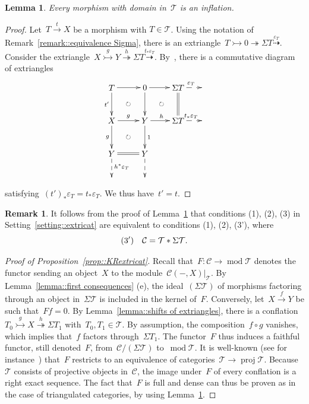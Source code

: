 \documentclass{amsart}
\newtheorem{lemma}[theorem]{Lemma}
\theoremstyle{definition}
\newtheorem{remark}[theorem]{Remark}
\newcommand{\cat}{\mathcal{C}}
\newcommand{\susp}{\Sigma}
\newcommand{\MOD}{\operatorname{mod}}
\newcommand{\proj}{\operatorname{proj}}
\newcommand{\tc}{\mathcal{T}}
\newcommand{\infl}{\rightarrowtail}
\newcommand{\defl}{\twoheadrightarrow}
\newcommand{\modt}{\MOD\tc}
\newcommand{\eps}{\varepsilon}
\begin{document}
\begin{lemma}\label{lemma:: mphs in T are inflations}
Every morphism with domain in~$\tc$ is an inflation.
\end{lemma}

\begin{proof}
Let~$T \overset{t}{\to} X$ be a morphism with $T\in \tc$.
Using the notation of Remark~\ref{remark::equivalence Sigma}, there is an extriangle~$T\infl 0\defl \susp T \overset{\eps_T}{\dashrightarrow}$.
Consider the extriangle~$X\overset{g}{\infl} Y \overset{h}{\defl} \susp T \overset{t_\ast\eps_T}{\dashrightarrow}$.
By~\cite[Proposition 3.17]{NakaokaPalu}, there is a commutative diagram of extriangles
\[
\xy
(-7,7)*+{T}="2";
(7,7)*+{0}="4";
(21,7)*+{\susp T}="6";
(32,7)*+{}="8";
%
(-7,-7)*+{X}="12";
(7,-7)*+{Y}="14";
(21,-7)*+{\susp T}="16";
(32,-7)*+{}="18";
%
(-7,-21)*+{Y}="22";
(7,-21)*+{Y}="24";
%
(-7,-32)*+{}="32";
(7,-32)*+{}="34";
%
{\ar@{->} "2";"4"};
{\ar@{->} "4";"6"};
{\ar@{-->}^{\eps_T} "6";"8"};
%
{\ar@{->}_{t'} "2";"12"};
{\ar "4";"14"};
{\ar@{=} "6";"16"};
%
{\ar^{g} "12";"14"};
{\ar^{h} "14";"16"};
{\ar@{-->}^{t_\ast\eps_T} "16";"18"};
%
{\ar_{g} "12";"22"};
{\ar^{1} "14";"24"};
%
{\ar@{=} "22";"24"};
%
{\ar@{-->}^{h^\ast\eps_T} "22";"32"};
{\ar@{-->} "24";"34"};
%
{\ar@{}|\circlearrowright "2";"14"};
{\ar@{}|\circlearrowright "4";"16"};
{\ar@{}|\circlearrowright "12";"24"};
\endxy
\]
satisfying~$(t')_\ast\eps_T=t_\ast\eps_T$.
We thus have~$t'=t$.
\end{proof}

\begin{remark}
 It follows from the proof of Lemma~\ref{lemma:: mphs in T are inflations} that conditions (1), (2), (3) in Setting~\ref{setting::extricat} are equivalent to conditions (1), (2), (3'), where
\[
{\rm (3')} \ \ \ \cat = \tc\ast\susp\tc.
\]
\end{remark}


\begin{proof}[Proof of Proposition~\ref{prop::KRextricat}]
Recall that~$F:\cat\to\modt$ denotes the functor sending an object~$X$ to the module~$\cat(-,X)|_\tc$.
By Lemma~\ref{lemma::first consequences} (e), the ideal~$(\susp\tc)$ of morphisms factoring through an object in~$\susp\tc$ is included in the kernel of~$F$.
Conversely, let~$X\xrightarrow{f}Y$ be such that~$Ff=0$.
By Lemma~\ref{lemma::shifts of extriangles}, there is a conflation~$T_0\overset{g}{\infl} X\overset{h}{\defl} \susp T_1$ with~$T_0,T_1\in\tc$.
By assumption, the composition~$f\circ g$ vanishes, which implies that~$f$ factors through~$\susp T_1$.
The functor~$F$ thus induces a faithful functor, still denoted~$F$, from~$\cat/(\susp\tc)$ to~$\modt$.
It is well-known (see for instance~\cite[Lemma 3.1]{AssemSimsonSkowronski}) that~$F$ restricts to an equivalence of categories~$\tc\to\proj\tc$.
Because~$\tc$ consists of projective objects in~$\cat$, the image under~$F$ of every conflation is a right exact sequence.
The fact that~$F$ is full and dense can thus be proven as in the case of triangulated categories, by using Lemma~\ref{lemma:: mphs in T are inflations}.
\end{proof}
\end{document}
